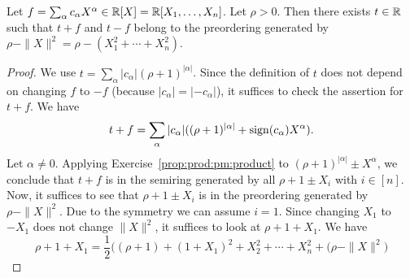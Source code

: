 \begin{lemma} \label{lem:t:minus:squares}
	Let $f = \sum_\alpha c_\alpha X^\alpha \in \mathbb{R}[X] = \mathbb{R}[X_1,\ldots,X_n]$. Let $\rho > 0$. Then there exists $t \in \mathbb{R}$ such that $t + f$ and $t- f$ belong to the preordering generated by $\rho - \|X\|^2 = \rho - (X_1^2 + \cdots + X_n^2)$. 
\end{lemma}
\begin{proof} 
	We use $t = \sum_\alpha |c_\alpha| (\rho+1)^{|\alpha|}$. Since the definition of $t$ does not depend on changing $f$ to $-f$ (because $|c_\alpha| = |-c_\alpha|$), it suffices to check the assertion for $t + f$. We have 
	\[
		t+ f = \sum_\alpha |c_\alpha| ( (\rho+1)^{|\alpha|} + \operatorname{sign}(c_\alpha) X^\alpha) .
	\]
	Let $\alpha \ne 0$. Applying Exercise~\ref{prop:prod:pm:product} to  $(\rho+1)^{|\alpha|} \pm X^\alpha$, we conclude that $t+f$ is in the semiring generated by all $\rho+1 \pm X_i$ with $i \in [n]$. Now, it suffices to see that $\rho+1 \pm X_i$ is in the preordering generated by $\rho - \|X\|^2$. Due to the symmetry we can assume $i=1$. Since changing $X_1$ to $-X_1$ does not change $\|X\|^2$, it suffices to look at $\rho + 1 + X_1$. We have
	\[
		\rho+1 + X_1 = \frac{1}{2} \bigl( (\rho+1) + (1+X_1)^2 + X_2^2 + \cdots + X_n^2  + (\rho - \|X\|^2 \bigr)
	\]
\end{proof}

